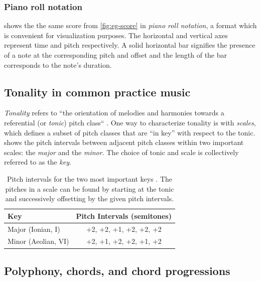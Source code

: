 \subsubsection{Piano roll notation}

 shows the the same score from
\vref{fig:eg-score} in \emph{piano roll notation}, a format which is convenient
for visualization purposes. The horizontal and vertical axes represent time and
pitch respectively. A solid horizontal bar signifies the presence of a note at
the corresponding pitch and offset and the length of the bar corresponds to the
note's duration.

\subsection{Tonality in common practice music}

\emph{Tonality} refers to ``the orientation of melodies and harmonies towards a
referential (or \emph{tonic}) pitch class`` \citep{grove-tonality}. One way to
characterize tonality is with \emph{scales}, which defines a subset of pitch
classes that are ``in key'' with respect to the tonic. 
shows the pitch intervals between adjacent pitch classes within two important
scales: the \emph{major} and the \emph{minor}. The choice of tonic and scale is
collectively referred to as the \emph{key}.

\begin{table}[htpb]
    \centering
    \begin{tabular}{lc}
        \toprule
        Key & Pitch Intervals (semitones) \\
        \midrule
        Major (Ionian, I) & +2, +2, +1, +2, +2, +2 \\
        Minor (Aeolian, VI) & +2, +1, +2, +2, +1, +2 \\
        \bottomrule
    \end{tabular}
    \caption{Pitch intervals for the two most important keys \citep{freedman2015correlational}. The pitches in a scale can be found by starting at the tonic and successively offsetting by the given pitch intervals.}
    \label{tab:key-intervals}
\end{table}

\subsection{Polyphony, chords, and chord progressions}

